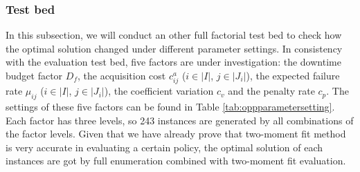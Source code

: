 \documentclass[preprint,12pt]{elsarticle}
\begin{document}
\subsubsection{Test bed}
 In this subsection, we will conduct an other full factorial test bed to check how the optimal solution changed under different parameter settings. In consistency with the evaluation test bed, five factors are under investigation: the downtime budget factor $D_{f}$, the acquisition cost ${c}^{a}_{ij}$ ($i\in \rvert I \lvert$, $j \in \rvert J_{i} \lvert$), the expected failure rate $\mu_{ij}$ ($i\in \rvert I \lvert$, $j \in \rvert J_{i} \lvert$), the coefficient variation $c_{v}$ and the penalty rate $c_{p}$. The settings of these five factors can be found in Table \ref{tab:oppparametersetting}. Each factor has three levels, so 243 instances are generated by all combinations of the factor levels. Given that we have already prove that two-moment fit method is very accurate in evaluating a certain policy, the optimal solution of each instances are got by full enumeration combined with two-moment fit evaluation.
\end{document}
